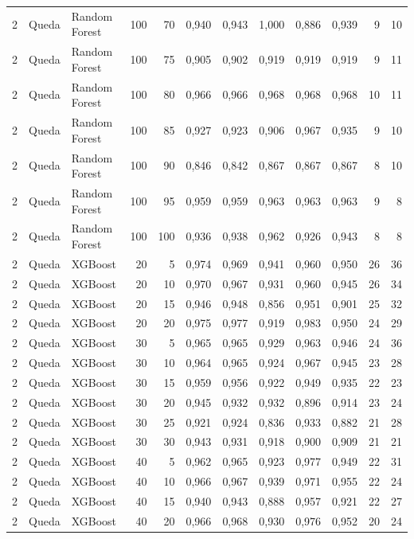 \begin{longtable}{@{}rllrrrrrrrrr@{}}
2 & Queda & Random Forest & 100 & 70 & 0,940 & 0,943 & 1,000 & 0,886 & 0,939 & 9 & 10 \\
2 & Queda & Random Forest & 100 & 75 & 0,905 & 0,902 & 0,919 & 0,919 & 0,919 & 9 & 11 \\
2 & Queda & Random Forest & 100 & 80 & 0,966 & 0,966 & 0,968 & 0,968 & 0,968 & 10 & 11 \\
2 & Queda & Random Forest & 100 & 85 & 0,927 & 0,923 & 0,906 & 0,967 & 0,935 & 9 & 10 \\
2 & Queda & Random Forest & 100 & 90 & 0,846 & 0,842 & 0,867 & 0,867 & 0,867 & 8 & 10 \\
2 & Queda & Random Forest & 100 & 95 & 0,959 & 0,959 & 0,963 & 0,963 & 0,963 & 9 & 8 \\
2 & Queda & Random Forest & 100 & 100 & 0,936 & 0,938 & 0,962 & 0,926 & 0,943 & 8 & 8 \\
2 & Queda & XGBoost & 20 & 5 & 0,974 & 0,969 & 0,941 & 0,960 & 0,950 & 26 & 36 \\
2 & Queda & XGBoost & 20 & 10 & 0,970 & 0,967 & 0,931 & 0,960 & 0,945 & 26 & 34 \\
2 & Queda & XGBoost & 20 & 15 & 0,946 & 0,948 & 0,856 & 0,951 & 0,901 & 25 & 32 \\
2 & Queda & XGBoost & 20 & 20 & 0,975 & 0,977 & 0,919 & 0,983 & 0,950 & 24 & 29 \\
2 & Queda & XGBoost & 30 & 5 & 0,965 & 0,965 & 0,929 & 0,963 & 0,946 & 24 & 36 \\
2 & Queda & XGBoost & 30 & 10 & 0,964 & 0,965 & 0,924 & 0,967 & 0,945 & 23 & 28 \\
2 & Queda & XGBoost & 30 & 15 & 0,959 & 0,956 & 0,922 & 0,949 & 0,935 & 22 & 23 \\
2 & Queda & XGBoost & 30 & 20 & 0,945 & 0,932 & 0,932 & 0,896 & 0,914 & 23 & 24 \\
2 & Queda & XGBoost & 30 & 25 & 0,921 & 0,924 & 0,836 & 0,933 & 0,882 & 21 & 28 \\
2 & Queda & XGBoost & 30 & 30 & 0,943 & 0,931 & 0,918 & 0,900 & 0,909 & 21 & 21 \\
2 & Queda & XGBoost & 40 & 5 & 0,962 & 0,965 & 0,923 & 0,977 & 0,949 & 22 & 31 \\
2 & Queda & XGBoost & 40 & 10 & 0,966 & 0,967 & 0,939 & 0,971 & 0,955 & 22 & 24 \\
2 & Queda & XGBoost & 40 & 15 & 0,940 & 0,943 & 0,888 & 0,957 & 0,921 & 22 & 27 \\
2 & Queda & XGBoost & 40 & 20 & 0,966 & 0,968 & 0,930 & 0,976 & 0,952 & 20 & 24 \\

\end{longtable}
